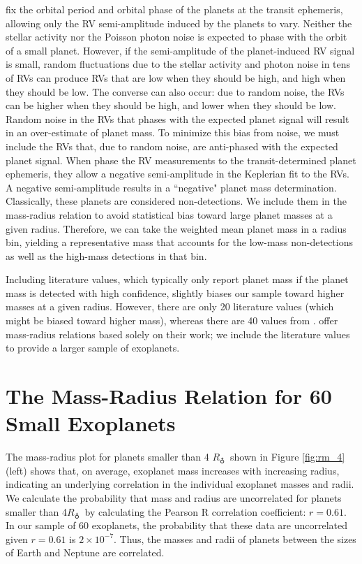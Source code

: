 \documentclass[iop]{emulateapj}
\newcommand{\rearth}{\ensuremath{R_\earth}}
\begin{document}
\citet{Marcy2013} fix the orbital period and orbital phase of the planets at the transit ephemeris, allowing only the RV semi-amplitude induced by the planets to vary.  Neither the stellar activity nor the Poisson photon noise is expected to phase with the orbit of a small planet.  However, if the semi-amplitude of the planet-induced RV signal is small, random fluctuations due to the stellar activity and photon noise in tens of RVs can produce RVs that are low when they should be high, and high when they should be low.  The converse can also occur: due to random noise, the RVs can be higher when they should be high, and lower when they should be low.  Random noise in the RVs that phases with the expected planet signal will result in an over-estimate of planet mass.  To minimize this bias from noise, we must include the RVs that, due to random noise, are anti-phased with the expected planet signal.  When \citet{Marcy2013} phase the RV measurements to the transit-determined planet ephemeris, they allow  a negative semi-amplitude in the Keplerian fit to the RVs.  A negative semi-amplitude results in a ``negative" planet mass determination.  Classically, these planets are considered non-detections.  We include them in the mass-radius relation to avoid statistical bias toward large planet masses at a given radius.  Therefore, we can take the weighted mean planet mass in a radius bin, yielding a representative mass that accounts for the low-mass non-detections as well as the high-mass detections in that bin.

Including literature values, which typically only report planet mass if the planet mass is detected with high confidence, slightly biases our sample toward higher masses at a given radius.  However, there are only 20 literature values (which might be biased toward higher mass), whereas there are 40 values from \citet{Marcy2013}.  
\citet{Marcy2013} offer mass-radius relations based solely on their work; we include the literature values to provide a larger sample of exoplanets.


\section{The Mass-Radius Relation for 60 Small Exoplanets}
The mass-radius plot for planets smaller than 4 \rearth\ shown in Figure \ref{fig:rm_4} (left) shows that, on average, exoplanet mass increases with increasing radius, indicating an underlying correlation in the individual exoplanet masses and radii.  We calculate the probability that mass and radius are uncorrelated for planets smaller than 4\rearth\ by calculating the Pearson R correlation coefficient: $r=0.61$.  In our sample of 60 exoplanets, the probability that these data are uncorrelated given $r = 0.61$ is $2 \times 10^{-7}$.  Thus, the masses and radii of planets between the sizes of Earth and Neptune are correlated.
\end{document}
